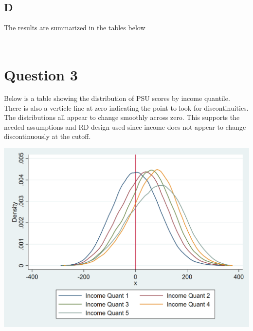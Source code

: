 \documentclass[11pt]{article}
\begin{document}
\subsection{D } 

The results are summarized in the tables below 

\begin{center}
	\begin{tabular}{c | c | c|c} 
		\hline
		
		\hline
		
	\end{tabular}
\end{center}


\begin{center}
	\begin{tabular}{c | c | c|c} 
		\hline
		
		\hline
		
	\end{tabular}
\end{center}




\section{ Question 3}

Below is a table showing the distribution of PSU scores by income quantile. There is also a verticle line at zero indicating the point to look for discontinuities. The distributions all appear to change smoothly across zero. This supports the needed assumptions and RD design used since income does not appear to change discontinuously at the cutoff. 


 	\includegraphics[width=1\linewidth]{3_plot.png}
\end{document}
